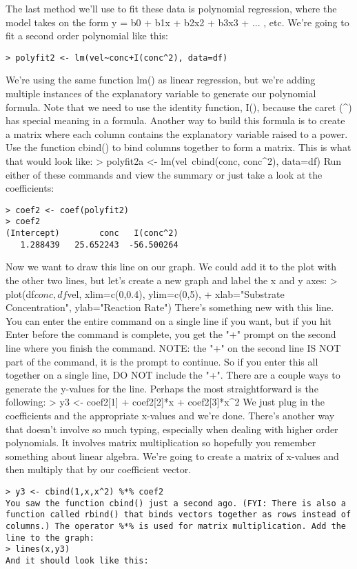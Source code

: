 {The last method we'll use to fit these data is polynomial regression, where the model takes on the form y = b0 + b1x + b2x2 + b3x3 + ... , etc. We're going to fit a second order polynomial like this: 
\begin{framed}
\begin{verbatim}
> polyfit2 <- lm(vel~conc+I(conc^2), data=df)
\end{verbatim}
\end{framed}
We're using the same function lm() as linear regression, but we're adding multiple instances of the explanatory variable to generate our polynomial formula. Note that we need to use the identity function, I(), because the caret (^) has special meaning in a formula. Another way to build this formula is to create a matrix where each column contains the explanatory variable raised to a power. Use the function cbind() to bind columns together to form a matrix. This is what that would look like: 
> polyfit2a <- lm(vel~cbind(conc, conc^2), data=df)
Run either of these commands and view the summary or just take a look at the coefficients: 
\begin{framed}
\begin{verbatim}
> coef2 <- coef(polyfit2)
> coef2
(Intercept)        conc   I(conc^2) 
   1.288439   25.652243  -56.500264 
   \end{verbatim}
\end{framed}
Now we want to draw this line on our graph. We could add it to the plot with the other two lines, but let's create a new graph and label the x and y axes: 
> plot(df$conc, df$vel, xlim=c(0,0.4), ylim=c(0,5), 
+ xlab="Substrate Concentration", ylab="Reaction Rate")
There's something new with this line. You can enter the entire command on a single line if you want, but if you hit Enter before the command is complete, you get the "+" prompt on the second line where you finish the command. NOTE: the "+" on the second line IS NOT part of the command, it is the prompt to continue. So if you enter this all together on a single line, DO NOT include the "+". 
There are a couple ways to generate the y-values for the line. Perhaps the most straightforward is the following: 
> y3 <- coef2[1] + coef2[2]*x + coef2[3]*x^2
We just plug in the coefficients and the appropriate x-values and we're done. There's another way that doesn't involve so much typing, especially when dealing with higher order polynomials. It involves matrix multiplication so hopefully you remember something about linear algebra. We're going to create a matrix of x-values and then multiply that by our coefficient vector. 
\begin{framed}
\begin{verbatim}
> y3 <- cbind(1,x,x^2) %*% coef2
You saw the function cbind() just a second ago. (FYI: There is also a function called rbind() that binds vectors together as rows instead of columns.) The operator %*% is used for matrix multiplication. Add the line to the graph: 
> lines(x,y3)
And it should look like this: 


\end{verbatim}
\end{framed}}
